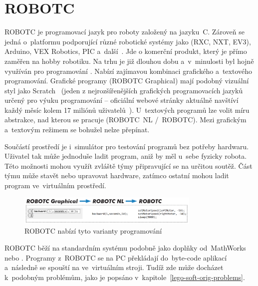\section{ROBOTC}

ROBOTC je programovací jazyk pro roboty založený na jazyku~C. 
Zároveň se jedná o~platformu podporující různé robotické systémy jako \legoM{} (RXC, NXT, EV3), Arduino, VEX Robotics, PIC a~další~\cite{legoProgramingPlatform_ROBOTC}.
Jde o komerční produkt, který je přímo zaměřen na hobby robotiku.
Na trhu je již dlouhou dobu a~v~minulosti byl hojně využíván pro programování \legoNXT{}.
Nabízí zajímavou kombinaci grafického a~textového programování. 
Grafické programy (ROBOTC Graphical) mají podobný vizuální styl jako Scratch~\cite{scratch_oficial-about} (jeden z nejrozšířenějších grafických programovacích jazyků určený pro výuku programování -- oficiální webové stránky aktuálně navštíví každý měsíc kolem 17 miliónů uživatelů~\cite{scratch_oficial-statistic}). 
U~textových programů lze volit míru abstrakce, nad kterou se pracuje (ROBOTC~NL /~ROBOTC). 
Mezi grafickým a~textovým režimem se bohužel nelze přepínat.

Součástí prostředí je i~simulátor pro testování programů bez potřeby hardwaru. 
Uživatel tak může jednoduše ladit program, aniž by měl u~sebe fyzicky robota.
Této možnosti mohou využít zvláště týmy připravující se na určitou soutěž. 
Část týmu může stavět nebo upravovat hardware, zatímco ostatní mohou ladit program ve~virtuálním prostředí. 

\begin{figure}[h]
	\centering
	\includegraphics[width=330px]{images/robotc_language-variants.png}
	\caption[ROBOTC nabízí tyto varianty programování]{ROBOTC nabízí tyto varianty programování\protect\footnotemark} %
	\label{robotc_language-variants}
\end{figure}


ROBOTC běží na standardním \lego{} systému podobně jako doplňky od~MathWorks nebo \NI{}.
Programy z~ROBOTC se na PC překládají do~byte-code aplikací a~následně se spouští na  ve~virtuálním stroji. 
Tudíž zde může docházet k~podobným problémům, jako je popsáno v~kapitole~\ref{lego-soft-orig-problems}.


